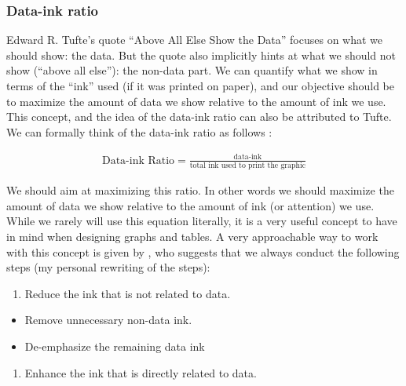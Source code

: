 \documentclass[
]{book}
\providecommand{\tightlist}{%
  \setlength{\itemsep}{0pt}\setlength{\parskip}{0pt}}
\begin{document}
\hypertarget{data-ink-ratio}{%
\subsubsection*{Data-ink ratio}\label{data-ink-ratio}}

Edward R. Tufte's quote ``Above All Else Show the Data'' \citep{tufte2001visual} focuses on what we should show: the data. But the quote also implicitly hints at what we should not show (``above all else''): the non-data part. We can quantify what we show in terms of the ``ink'' used (if it was printed on paper), and our objective should be to maximize the amount of data we show relative to the amount of ink we use. This concept, and the idea of the data-ink ratio can also be attributed to Tufte. We can formally think of the data-ink ratio as follows \citep{tufte2001visual}:

\begin{align}
  \text{Data-ink Ratio}=\frac{\text{data-ink}}{\text{total ink used to print the graphic}}
\end{align}

We should aim at maximizing this ratio. In other words we should maximize the amount of data we show relative to the amount of ink (or attention) we use. While we rarely will use this equation literally, it is a very useful concept to have in mind when designing graphs and tables. A very approachable way to work with this concept is given by \citep{few2012show}, who suggests that we always conduct the following steps (my personal rewriting of the steps):

\begin{enumerate}
\def\labelenumi{\arabic{enumi}.}
\tightlist
\item
  Reduce the ink that is not related to data.
\end{enumerate}

\begin{itemize}
\tightlist
\item
  Remove unnecessary non-data ink.
\item
  De-emphasize the remaining data ink
\end{itemize}

\begin{enumerate}
\def\labelenumi{\arabic{enumi}.}
\setcounter{enumi}{1}
\tightlist
\item
  Enhance the ink that is directly related to data.
\end{enumerate}
\end{document}
